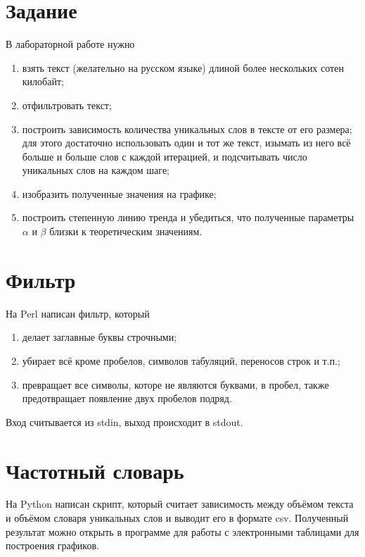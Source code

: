\section{Задание}
В лабораторной работе нужно
\begin{enumerate}
  \item
    взять текст (желательно на русском языке)
    длиной более нескольких сотен килобайт;
  \item
    отфильтровать текст;
  \item
    построить зависимость количества уникальных слов в тексте
    от его размера; для этого достаточно использовать один и тот же текст,
    изымать из него всё больше и больше слов с каждой итерацией,
    и подсчитывать число уникальных слов на каждом шаге;
  \item
    изобразить полученные значения на графике;
  \item
    построить степенную линию тренда и убедиться,
    что полученные параметры $\alpha$ и $\beta$ близки к
    теоретическим значениям.
\end{enumerate}

\section{Фильтр}
На Perl написан фильтр, который
\begin{enumerate}
  \item делает заглавные буквы строчными;
  \item убирает всё кроме пробелов, символов табуляций, переносов строк и т.п.;
  \item превращает все символы, которе не являются буквами, в пробел, также
    предотвращает появление двух пробелов подряд.
\end{enumerate}

Вход считывается из stdin, выход происходит в stdout.

\lstset{inputencoding=utf8, extendedchars=\true}


\section{Частотный словарь}
На Python написан скрипт, который считает зависимость между объёмом текста
и объёмом словаря уникальных слов и выводит его в формате csv.
Полученный результат можно открыть в программе для работы
с электронными таблицами для построения графиков.

